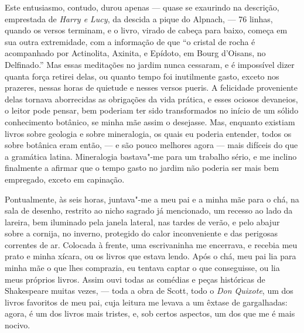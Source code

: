 \noindent{}Este entusiasmo, contudo, durou apenas --- quase se exaurindo na
descrição, emprestada de \textit{Harry e Lucy}, da descida a pique do
Alpnach, --- 76 linhas, quando os versos terminam, e o livro, virado de
cabeça para baixo, começa em sua outra extremidade, com a informação de
que ``o cristal de rocha é acompanhado por Actinolita, Axinita, e
Epídoto, em Bourg d'Oisans, no Delfinado.'' Mas essas meditações no
jardim nunca cessaram, e é impossível dizer quanta força retirei delas,
ou quanto tempo foi inutilmente gasto, exceto nos prazeres, nessas horas
de quietude e nesses versos pueris. A felicidade proveniente delas
tornava aborrecidas as obrigações da vida prática, e esses ociosos
devaneios, o leitor pode pensar, bem poderiam ter sido transformados no
início de um sólido conhecimento botânico, se minha mãe assim o
desejasse. Mas, enquanto existiam livros sobre geologia e sobre
mineralogia, os quais eu poderia entender, todos os sobre botânica eram
então, --- e são pouco melhores agora --- mais difíceis do que a gramática
latina. Mineralogia bastava"-me para um trabalho sério, e me inclino
finalmente a afirmar que o tempo gasto no jardim não poderia ser mais
bem empregado, exceto em capinação.

Pontualmente, às seis horas, juntava"-me a meu pai e a minha mãe para
o chá, na sala de desenho, restrito ao nicho sagrado já mencionado, um
recesso ao lado da lareira, bem iluminado pela janela lateral, nas
tardes de verão, e pelo abajur sobre a cornija, no inverno, protegido do
calor inconveniente e das perigosas correntes de ar. Colocada à frente,
uma escrivaninha me encerrava, e recebia meu prato e minha xícara, ou os
livros que estava lendo. Após o chá, meu pai lia para minha mãe o que
lhes comprazia, eu tentava captar o que conseguisse, ou lia meus
próprios livros. Assim ouvi todas as comédias e peças históricas de
Shakespeare muitas vezes, --- toda a obra de Scott, todo o \textit{Don
Quixote}, um dos livros favoritos de meu pai, cuja leitura me levava a
um êxtase de gargalhadas: agora, é um dos livros mais tristes, e, sob
certos aspectos, um dos que me é mais nocivo.

